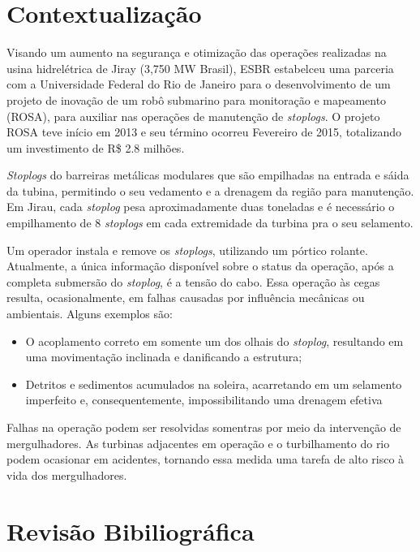 \section{Contextualização}
Visando um aumento na segurança e otimização das operações realizadas na usina 
hidrelétrica de Jiray (3,750 MW Brasil), ESBR estabelceu uma parceria com a 
Universidade Federal do Rio de Janeiro para o desenvolvimento de um projeto de 
inovação de um robô submarino para monitoração e mapeamento (ROSA), para auxiliar
nas operações de manutenção de \textit{stoplogs}. O projeto ROSA teve início em
2013 e seu término ocorreu Fevereiro de 2015, totalizando um investimento de
R\$ 2.8 milhões.

\textit{Stoplogs} do barreiras metálicas modulares que são empilhadas na entrada
e sáida da tubina, permitindo o seu vedamento e a drenagem da região para
manutenção. Em Jirau, cada \textit{stoplog} pesa aproximadamente duas toneladas
e é necessário o empilhamento de 8 \textit{stoplogs} em cada extremidade da
turbina pra o seu selamento.

Um operador instala e remove os \textit{stoplogs}, utilizando um pórtico
rolante. Atualmente, a única informação disponível sobre o status da operação,
após a completa submersão do \textit{stoplog}, é a tensão do cabo. Essa operação
às cegas resulta, ocasionalmente, em falhas causadas por influência mecânicas ou
ambientais. Alguns exemplos são:
\begin{itemize}
  \item O acoplamento correto em somente um dos olhais do \textit{stoplog},
  resultando em uma movimentação inclinada e danificando a estrutura;
  \item Detritos e sedimentos acumulados na soleira, acarretando em um selamento
  imperfeito e, consequentemente, impossibilitando uma drenagem efetiva
\end{itemize}

Falhas na operação podem ser resolvidas somentras por meio da intervenção de
mergulhadores. As turbinas adjacentes em operação e o turbilhamento do rio podem
ocasionar em acidentes, tornando essa medida uma tarefa de alto risco à vida dos
mergulhadores.

\section{Revisão Bibiliográfica}

